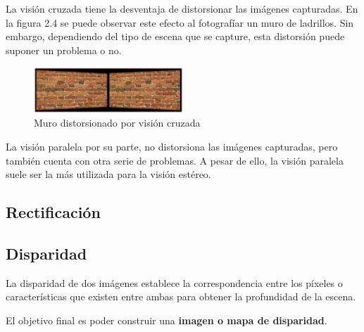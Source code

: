 La visión cruzada tiene la desventaja de distorsionar las imágenes capturadas.
En la figura 2.4 se puede observar este efecto al fotografíar un muro de
ladrillos. Sin embargo, dependiendo del tipo de escena que se capture, esta
distorsión puede suponer un problema o no.

\begin{figure}[!th]
  \begin{center}
    \includegraphics[width=0.5\textwidth]{images/cap2/VisionCruzadaMuro.eps}
    \caption{Muro distorsionado por visión cruzada}
    \label{fig:VisionCruzadaMuro}
  \end{center}
\end{figure}

La visión paralela por su parte, no distorsiona las imágenes capturadas, pero
también cuenta con otra serie de problemas. A pesar de ello, la visión paralela
suele ser la más utilizada para la visión estéreo.

\subsection{Rectificación}

\subsection{Disparidad}
La disparidad de dos imágenes establece la correspondencia entre los píxeles o
características que existen entre ambas para obtener la profundidad de la
escena.

El objetivo final es poder construir una \textbf{imagen o mapa de disparidad}.

